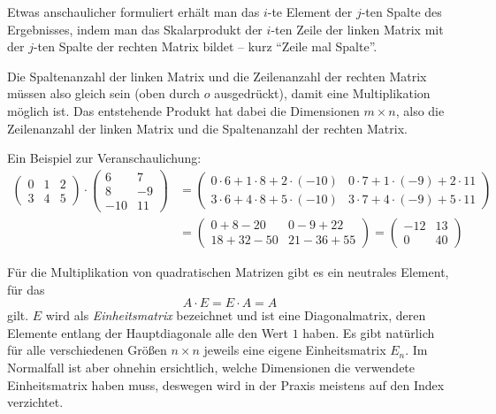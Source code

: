 Etwas anschaulicher formuliert erhält man das $i$-te Element der $j$-ten Spalte des Ergebnisses, indem man das Skalarprodukt der $i$-ten Zeile der linken Matrix mit der $j$-ten Spalte der rechten Matrix bildet -- kurz \enquote{Zeile mal Spalte}.

Die Spaltenanzahl der linken Matrix und die Zeilenanzahl der rechten Matrix müssen also gleich sein (oben durch $o$ ausgedrückt), damit eine Multiplikation möglich ist. Das entstehende Produkt hat dabei die Dimensionen $m \times n$, also die Zeilenanzahl der linken Matrix und die Spaltenanzahl der rechten Matrix.

Ein Beispiel zur Veranschaulichung:
\begin{equation}
\begin{split}
 \begin{pmatrix}
  0 & 1 & 2 \\
  3 & 4 & 5
 \end{pmatrix}
 \cdot
 \begin{pmatrix}
  6 & 7 \\
  8 & -9 \\
  -10 & 11
 \end{pmatrix}
 &=
 \begin{pmatrix}
  0 \cdot 6 + 1 \cdot 8 + 2 \cdot (-10) & 0 \cdot 7 + 1 \cdot (-9) + 2 \cdot 11 \\
  3 \cdot 6 + 4 \cdot 8 + 5 \cdot (-10) & 3 \cdot 7 + 4 \cdot (-9) + 5 \cdot 11
 \end{pmatrix}\\
 &=
 \begin{pmatrix}
  0 + 8 - 20 & 0 - 9 + 22 \\
  18 + 32 - 50 & 21 - 36 + 55
 \end{pmatrix}
 =
 \begin{pmatrix}
   -12 & 13 \\
   0 & 40
 \end{pmatrix}
\end{split}
\end{equation}

Für die Multiplikation von quadratischen Matrizen gibt es ein neutrales Element, für das
\begin{equation}
 A \cdot E = E \cdot A = A
\end{equation}
gilt. $E$ wird als \emph{Einheitsmatrix} bezeichnet und ist eine Diagonalmatrix, deren Elemente entlang der Hauptdiagonale alle den Wert $1$ haben. Es gibt natürlich für alle verschiedenen Größen $n \times n$ jeweils eine eigene Einheitsmatrix $E_n$. Im Normalfall ist aber ohnehin ersichtlich, welche Dimensionen die verwendete Einheitsmatrix haben muss, deswegen wird in der Praxis meistens auf den Index verzichtet.

